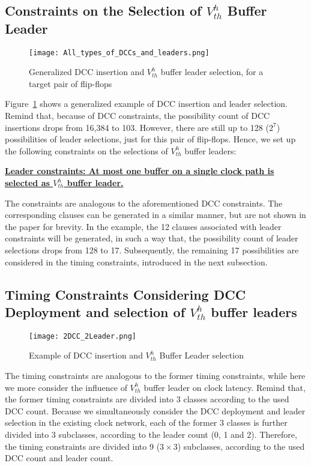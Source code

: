 \subsection{Constraints on the Selection of $V_{th}^h$ Buffer Leader}
\begin{figure}
	\centering
	\texttt{[image: All\_types\_of\_DCCs\_and\_leaders.png]}
	\caption{Generalized DCC insertion and $V_{th}^h$ buffer leader selection, for a target pair of flip-flops}
	\label{fig:leadertype}
\end{figure}

Figure~\ref{fig:leadertype} shows a generalized example of DCC insertion and leader selection. Remind that, because of DCC constraints, the possibility count of DCC insertions drops from 16,384 to 103. However, there are still up to 128 ($2^7$) possibilities of leader selections, just for this pair of flip-flops. Hence, we set up the following constraints on the selections of $V_{th}^h$ buffer leaders:

\noindent \textbf{\uline{Leader constraints: At most one buffer on a single clock path is selected as $V_{th}^h$ buffer leader.}}

The constraints are analogous to the aforementioned DCC constraints. The corresponding clauses can be generated in a similar manner, but are not shown in the paper for brevity. In the example, the 12 clauses associated with leader constraints will be generated, in such a way that, the possibility count of leader selections drops from 128 to 17. Subsequently, the remaining 17 possibilities are considered in the timing constraints, introduced in the next subsection.

\subsection{Timing Constraints Considering DCC Deployment and selection of $V_{th}^h$ buffer leaders}
\begin{figure}
    \centering
    \texttt{[image: 2DCC\_2Leader.png]}
    \caption{Example of DCC insertion and $V_{th}^h$ Buffer Leader selection}
    \label{fig:2dcc2leader}
\end{figure}
The timing constraints are analogous to the former timing constraints, while here we more consider the influence of $V_{th}^h$ buffer leader on clock latency. Remind that, the former timing constraints are divided into 3 classes according to the used DCC count. Because we simultaneously consider the DCC deployment and leader selection in the existing clock network, each of the former 3 classes is further divided into 3 subclasses, according to the leader count (0, 1 and 2). Therefore, the timing constraints are divided into 9 ($3 \times 3$) subclasses, according to the used DCC count and leader count.

